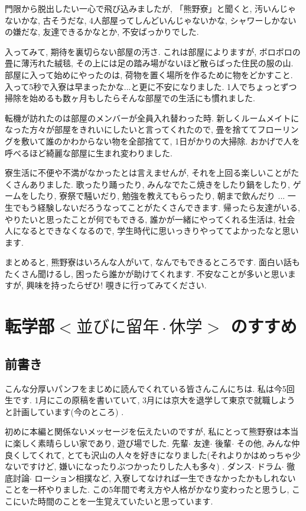 \documentclass[10pt,b5jsbook,dvips,dvipdfmx,openany]{jsbook}
\theoremstyle{definition}
\begin{document}
	 門限から脱出したい一心で飛び込みましたが, 「熊野寮」と聞くと, 汚いんじゃないかな, 古そうだな, 4人部屋ってしんどいんじゃないかな, シャワーしかないの嫌だな, 友達できるかなとか, 不安ばっかりでした. 

 	入ってみて, 期待を裏切らない部屋の汚さ. これは部屋によりますが, ボロボロの畳に薄汚れた絨毯, その上には足の踏み場がないほど散らばった住民の服の山. 部屋に入って始めにやったのは, 荷物を置く場所を作るために物をどかすこと. 入って5秒で入寮は早まったかな...と更に不安になりました. 1人でちょっとずつ掃除を始めるも数ヶ月もしたらそんな部屋での生活にも慣れました. 
	
 	転機が訪れたのは部屋のメンバーが全員入れ替わった時. 新しくルームメイトになった方々が部屋をきれいにしたいと言ってくれたので, 畳を捨ててフローリングを敷いて誰のかわからない物を全部捨てて, 1日がかりの大掃除. おかげで人を呼べるほど綺麗な部屋に生まれ変わりました. 

 	寮生活に不便や不満がなかったとは言えませんが, それを上回る楽しいことがたくさんありました. 歌ったり踊ったり, みんなでたこ焼きをしたり鍋をしたり, ゲームをしたり, 寮祭で騒いだり, 勉強を教えてもらったり, 朝まで飲んだり ... 一生でもう経験しないだろうなってことがたくさんできます. 帰ったら友達がいる, やりたいと思ったことが何でもできる, 誰かが一緒にやってくれる生活は, 社会人になるとできなくなるので, 学生時代に思いっきりやっててよかったなと思います. 

	まとめると, 熊野寮はいろんな人がいて, なんでもできるところです. 面白い話もたくさん聞けるし, 困ったら誰かが助けてくれます. 不安なことが多いと思いますが, 興味を持ったらぜひ! 覗きに行ってみてください. 


	
	\section{転学部$ < 並びに留年 \cdot 休学 > $ のすすめ}
		\subsection{前書き}
		こんな分厚いパンフをまじめに読んでくれている皆さんこんにちは. 私は今5回生です. 1月にこの原稿を書いていて, 3月には京大を退学して東京で就職しようと計画しています(今のところ) . 

		初めに本編と関係ないメッセージを伝えたいのですが, 私にとって熊野寮は本当に楽しく素晴らしい家であり, 遊び場でした. 先輩$ \cdot $ 友達$ \cdot $ 後輩$ \cdot $ その他, みんな仲良くしてくれて, とても沢山の人々を好きになりました(それよりかはめっちゃ少ないですけど, 嫌いになったりぶつかったりした人も多々) . ダンス$ \cdot $ ドラム$ \cdot $ 徹底討論$ \cdot $ ローション相撲など, 入寮してなければ一生できなかったかもしれないことを一杯やりました. この5年間で考え方や人格がかなり変わったと思うし, ここにいた時間のことを一生覚えていたいと思っています. 
\end{document}
